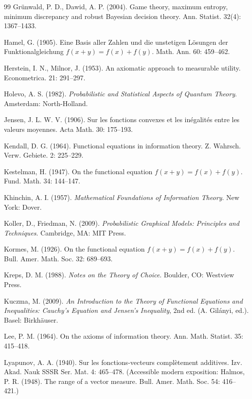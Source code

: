 \documentclass{article}
\theoremstyle{plain}
\theoremstyle{definition}
\begin{document}
\begin{thebibliography}{99}
Gr\"unwald, P. D., Dawid, A. P. (2004). Game theory, maximum entropy, minimum
discrepancy and robust Bayesian decision theory. Ann. Statist. 32(4):
1367--1433.

Hamel, G. (1905). Eine Basis aller Zahlen und die unstetigen L\"osungen der
Funktionalgleichung $f(x+y)=f(x)+f(y)$. Math. Ann. 60: 459--462.

Herstein, I. N., Milnor, J. (1953). An axiomatic approach to measurable
utility. Econometrica. 21: 291--297.

Holevo, A. S. (1982). \emph{Probabilistic and Statistical Aspects of Quantum
Theory}. Amsterdam: North-Holland.

Jensen, J. L. W. V. (1906). Sur les fonctions convexes et les in\'egalit\'es
entre les valeurs moyennes. Acta Math. 30: 175--193.

Kendall, D. G. (1964). Functional equations in information theory. Z.
Wahrsch. Verw. Gebiete. 2: 225--229.

Kestelman, H. (1947). On the functional equation $f(x+y)=f(x)+f(y)$. Fund.
Math. 34: 144--147.

Khinchin, A. I. (1957). \emph{Mathematical Foundations of Information
Theory}. New York: Dover.

Koller, D., Friedman, N. (2009). \emph{Probabilistic Graphical Models:
Principles and Techniques}. Cambridge, MA: MIT Press.

Kormes, M. (1926). On the functional equation $f(x+y)=f(x)+f(y)$. Bull. Amer.
Math. Soc. 32: 689--693.

Kreps, D. M. (1988). \emph{Notes on the Theory of Choice}. Boulder, CO:
Westview Press.

Kuczma, M. (2009). \emph{An Introduction to the Theory of Functional
Equations and Inequalities: Cauchy's Equation and Jensen's Inequality}, 2nd
ed. (A. Gil\'anyi, ed.). Basel: Birkh\"auser.

Lee, P. M. (1964). On the axioms of information theory. Ann. Math. Statist.
35: 415--418.

Lyapunov, A. A. (1940). Sur les fonctions-vecteurs compl\`etement additives.
Izv. Akad. Nauk SSSR Ser. Mat. 4: 465--478. (Accessible modern exposition:
Halmos, P. R. (1948). The range of a vector measure. Bull. Amer. Math. Soc.
54: 416--421.)


\end{thebibliography}
\end{document}
